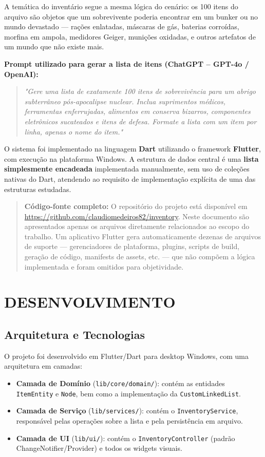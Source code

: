\documentclass[12pt,a4paper]{article}
\begin{document}
A temática do inventário segue a mesma lógica do cenário: os 100 itens do arquivo são objetos que um sobrevivente poderia encontrar em um bunker ou no mundo devastado — rações enlatadas, máscaras de gás, baterias corroídas, morfina em ampola, medidores Geiger, munições oxidadas, e outros artefatos de um mundo que não existe mais.

\textbf{Prompt utilizado para gerar a lista de itens (ChatGPT – GPT-4o / OpenAI):}

\begin{quote}
\textit{"Gere uma lista de exatamente 100 itens de sobrevivência para um abrigo subterrâneo pós-apocalipse nuclear. Inclua suprimentos médicos, ferramentas enferrujadas, alimentos em conserva bizarros, componentes eletrônicos sucateados e itens de defesa. Formate a lista com um item por linha, apenas o nome do item."}
\end{quote}

O sistema foi implementado na linguagem \textbf{Dart} utilizando o framework \textbf{Flutter}, com execução na plataforma Windows. A estrutura de dados central é uma \textbf{lista simplesmente encadeada} implementada manualmente, sem uso de coleções nativas do Dart, atendendo ao requisito de implementação explícita de uma das estruturas estudadas.

\begin{quote}
\textbf{Código-fonte completo:} O repositório do projeto está disponível em \url{https://github.com/claudiomedeiros82/inventory}. Neste documento são apresentados apenas os arquivos diretamente relacionados ao escopo do trabalho. Um aplicativo Flutter gera automaticamente dezenas de arquivos de suporte — gerenciadores de plataforma, plugins, scripts de build, geração de código, manifests de assets, etc. — que não compõem a lógica implementada e foram omitidos para objetividade.
\end{quote}

\section{DESENVOLVIMENTO}

\subsection{Arquitetura e Tecnologias}

O projeto foi desenvolvido em Flutter/Dart para desktop Windows, com uma arquitetura em camadas:

\begin{itemize}
    \item \textbf{Camada de Domínio} (\texttt{lib/core/domain/}): contém as entidades \texttt{ItemEntity} e \texttt{Node}, bem como a implementação da \texttt{CustomLinkedList}.
    \item \textbf{Camada de Serviço} (\texttt{lib/services/}): contém o \texttt{InventoryService}, responsável pelas operações sobre a lista e pela persistência em arquivo.
    \item \textbf{Camada de UI} (\texttt{lib/ui/}): contém o \texttt{InventoryController} (padrão ChangeNotifier/Provider) e todos os widgets visuais.
\end{itemize}
\end{document}
